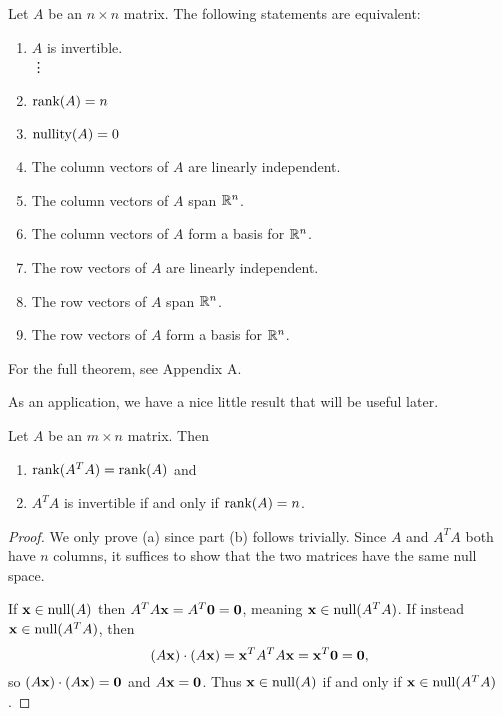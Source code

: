 \documentclass[../m073main.tex]{subfiles}
\begin{document}
\begin{theorem}
	Let $A$ be an $n\times n$ matrix.
	The following statements are equivalent:
	\begin{multicols}{2}
		\begin{enumerate}[label=(\alph*)]
			\item $A$ is invertible. \\
			\phantom{~}\hspace{-19.5pt} \vdots
			\setcounter{enumi}{5}		
			\item $\textrm{rank}(A) = n$
			\item $\textrm{nullity}(A) = 0$
			\item The column vectors of $A$ are linearly independent.
			\item The column vectors of $A$ span $\mathbb{R}^n$.
			\item The column vectors of $A$ form a basis for $\mathbb{R}^n$.
			\item The row vectors of $A$ are linearly independent.
			\item The row vectors of $A$ span $\mathbb{R}^n$.
			\item The row vectors of $A$ form a basis for $\mathbb{R}^n$.
		\end{enumerate}
	\end{multicols}
	For the full theorem, see Appendix A.
\end{theorem}

As an application, we have a nice little result that will be useful later.

\begin{theorem}
	Let $A$ be an $m\times n$ matrix.
	Then
	\begin{enumerate}[label=(\alph*)]
		\item $\textrm{rank}(A^TA) = \textrm{rank}(A)$ and
		\item $A^TA$ is invertible if and only if $\textrm{rank}(A) = n$.
	\end{enumerate}
\end{theorem}

\begin{proof}
	We only prove (a) since part (b) follows trivially.
	Since $A$ and $A^TA$ both have $n$ columns, it suffices to show that the two matrices have the same null space.

	If $\mathbf{x} \in \textrm{null}(A)$ then $A^T A \mathbf{x} = A^T \mathbf{0} = \mathbf{0}$, meaning $\mathbf{x} \in \textrm{null} (A^TA)$.
	If instead $\mathbf{x} \in \textrm{null} (A^T A)$, then
	\[ (A \mathbf{x}) \cdot (A \mathbf{x}) = \mathbf{x}^T A^T A \mathbf{x} = \mathbf{x}^T \mathbf{0} = \mathbf{0}, \]
	so $(A \mathbf{x}) \cdot (A \mathbf{x}) = \mathbf{0}$ and $A \mathbf{x} = \mathbf{0}$.
	Thus $\mathbf{x} \in \textrm{null}(A)$ if and only if $\mathbf{x} \in \textrm{null}(A^T A)$.
\end{proof}
\end{document}
